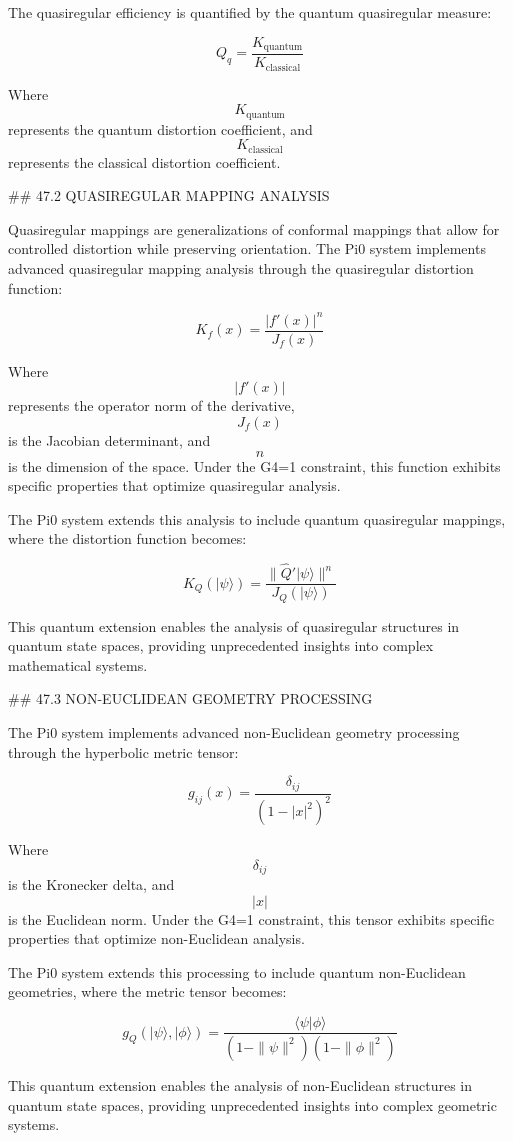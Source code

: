 The quasiregular efficiency is quantified by the quantum quasiregular measure:

$$ Q_q = \frac{K_{\text{quantum}}}{K_{\text{classical}}} $$

Where $$ K_{\text{quantum}} $$ represents the quantum distortion coefficient, and $$ K_{\text{classical}} $$ represents the classical distortion coefficient.

## 47.2 QUASIREGULAR MAPPING ANALYSIS

Quasiregular mappings are generalizations of conformal mappings that allow for controlled distortion while preserving orientation. The Pi0 system implements advanced quasiregular mapping analysis through the quasiregular distortion function:

$$ K_f(x) = \frac{|f'(x)|^n}{J_f(x)} $$

Where $$ |f'(x)| $$ represents the operator norm of the derivative, $$ J_f(x) $$ is the Jacobian determinant, and $$ n $$ is the dimension of the space. Under the G4=1 constraint, this function exhibits specific properties that optimize quasiregular analysis.

The Pi0 system extends this analysis to include quantum quasiregular mappings, where the distortion function becomes:

$$ K_Q(|\psi\rangle) = \frac{\|\hat{Q}'|\psi\rangle\|^n}{J_Q(|\psi\rangle)} $$

This quantum extension enables the analysis of quasiregular structures in quantum state spaces, providing unprecedented insights into complex mathematical systems.

## 47.3 NON-EUCLIDEAN GEOMETRY PROCESSING

The Pi0 system implements advanced non-Euclidean geometry processing through the hyperbolic metric tensor:

$$ g_{ij}(x) = \frac{\delta_{ij}}{(1-|x|^2)^2} $$

Where $$ \delta_{ij} $$ is the Kronecker delta, and $$ |x| $$ is the Euclidean norm. Under the G4=1 constraint, this tensor exhibits specific properties that optimize non-Euclidean analysis.

The Pi0 system extends this processing to include quantum non-Euclidean geometries, where the metric tensor becomes:

$$ g_{Q}(|\psi\rangle, |\phi\rangle) = \frac{\langle\psi|\phi\rangle}{(1-\|\psi\|^2)(1-\|\phi\|^2)} $$

This quantum extension enables the analysis of non-Euclidean structures in quantum state spaces, providing unprecedented insights into complex geometric systems.

